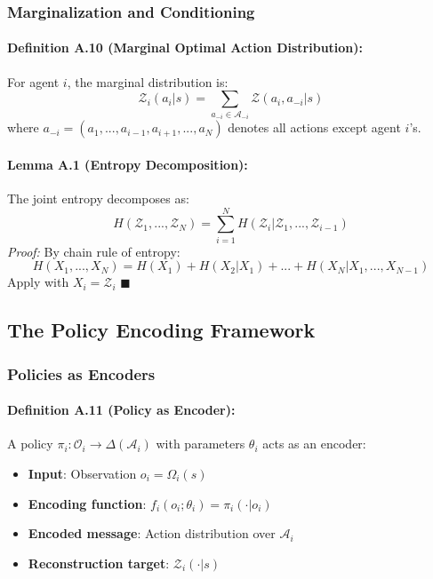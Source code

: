 \documentclass[10pt, letterpaper]{article}
\begin{document}
\subsubsection{Marginalization and Conditioning}

\paragraph{Definition A.10 (Marginal Optimal Action Distribution):} For agent $i$, the marginal distribution is:
\[\mathcal{Z}_i(a_i|s) = \sum_{a_{-i} \in \mathcal{A}_{-i}} \mathcal{Z}(a_i, a_{-i}|s)\]
where $a_{-i} = (a_1, ..., a_{i-1}, a_{i+1}, ..., a_N)$ denotes all actions except agent $i$'s.

\paragraph{Lemma A.1 (Entropy Decomposition):} The joint entropy decomposes as:
\[H(\mathcal{Z}_1, ..., \mathcal{Z}_N) = \sum_{i=1}^N H(\mathcal{Z}_i | \mathcal{Z}_1, ..., \mathcal{Z}_{i-1})\]
\emph{Proof:} By chain rule of entropy:
\[H(X_1, ..., X_N) = H(X_1) + H(X_2|X_1) + ... + H(X_N|X_1, ..., X_{N-1})\]
Apply with $X_i = \mathcal{Z}_i$ $\blacksquare$

\subsection{The Policy Encoding Framework}

\subsubsection{Policies as Encoders}

\paragraph{Definition A.11 (Policy as Encoder):} A policy $\pi_i: \mathcal{O}_i \to \Delta(\mathcal{A}_i)$ with parameters $\theta_i$ acts as an encoder:
\begin{itemize}
    \item \textbf{Input}: Observation $o_i = \Omega_i(s)$
    \item \textbf{Encoding function}: $f_i(o_i; \theta_i) = \pi_i(\cdot|o_i)$
    \item \textbf{Encoded message}: Action distribution over $\mathcal{A}_i$
    \item \textbf{Reconstruction target}: $\mathcal{Z}_i(\cdot|s)$
\end{itemize}
\end{document}
